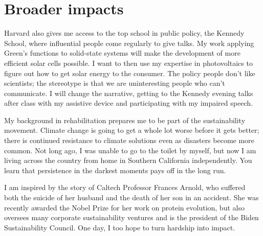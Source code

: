 \documentclass[11pt]{article} %
\begin{document}
\section{Broader impacts}  
Harvard also gives me access to the top school in public policy, the Kennedy School, where influential people come regularly to give talks. My work applying Green's functions to solid-state systems will make the development of more efficient solar cells possible. I want to then use my expertise in photovoltaics to figure out how to get solar energy to the consumer. The policy people don't like scientists; the stereotype is that we are uninteresting people who can't communicate. I will change the narrative, getting to the Kennedy evening talks after class with my assistive device and participating with my impaired speech.

My background in rehabilitation prepares me to be part of the sustainability movement. Climate change
is going to get a whole lot worse before it gets better; there is continued resistance to climate solutions even
as disasters become more common. Not long ago, I was unable to go to the toilet by myself, but now I am
living across the country from home in Southern California independently. You learn that persistence in the
darkest moments pays off in the long run.

I am inspired by the story of Caltech Professor Frances Arnold, who suffered both the suicide of her
husband and the death of her son in an accident. She was recently awarded the Nobel Prize for her work on
protein evolution, but also oversees many corporate sustainability ventures and is the president of the Biden
Sustainability Council. One day, I too hope to turn hardship into impact.
\end{document}
